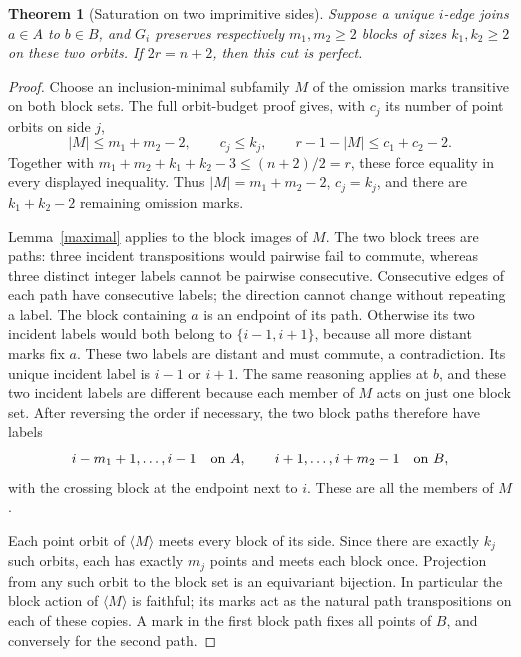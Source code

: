 \documentclass[11pt,a4paper]{article}
\newtheorem{theorem}[lemma]{Theorem}
\newcommand{\gen}[1]{\langle#1\rangle}
\begin{document}
\begin{theorem}[Saturation on two imprimitive sides]\label{sat}
Suppose a unique $i$-edge joins $a\in A$ to $b\in B$,
and $G_i$ preserves respectively $m_1,m_2\ge2$ blocks of
sizes $k_1,k_2\ge2$ on these two orbits. If $2r=n+2$,
then this cut is perfect.
\end{theorem}
\begin{proof}
Choose an inclusion-minimal subfamily $M$ of the omission
marks transitive on both block sets. The full orbit-budget
proof gives, with $c_j$ its number of point orbits on side $j$,
\[
 |M|\le m_1+m_2-2,\qquad c_j\le k_j,\qquad
 r-1-|M|\le c_1+c_2-2.
\]
Together with
$m_1+m_2+k_1+k_2-3\le(n+2)/2=r$, these force equality
in every displayed inequality. Thus $|M|=m_1+m_2-2$,
$c_j=k_j$, and there are $k_1+k_2-2$ remaining omission marks.

Lemma~\ref{maximal} applies to the block images of $M$.
The two block trees are paths: three incident transpositions
would pairwise fail to commute, whereas three distinct
integer labels cannot be pairwise consecutive. Consecutive
edges of each path have consecutive labels; the direction
cannot change without repeating a label. The block containing
$a$ is an endpoint of its path. Otherwise its two incident
labels would both belong to $\{i-1,i+1\}$, because all more
distant marks fix $a$. These two labels are distant and must
commute, a contradiction. Its unique incident label is
$i-1$ or $i+1$. The same reasoning applies at $b$, and these
two incident labels are different because each member of $M$
acts on just one block set. After reversing the order if
necessary, the two block paths therefore have labels
\[
 i-m_1+1,\ldots,i-1\quad\hbox{on }A,
 \qquad i+1,\ldots,i+m_2-1\quad\hbox{on }B,
\]
with the crossing block at the endpoint next to $i$.
These are all the members of $M$.

Each point orbit of $\gen M$ meets every block of its side.
Since there are exactly $k_j$ such orbits, each has exactly
$m_j$ points and meets each block once. Projection from any
such orbit to the block set is an equivariant bijection.
In particular the block action of $\gen M$ is faithful;
its marks act as the natural path transpositions on each
of these copies. A mark in the first block path fixes all
points of $B$, and conversely for the second path.


\end{proof}
\end{document}
